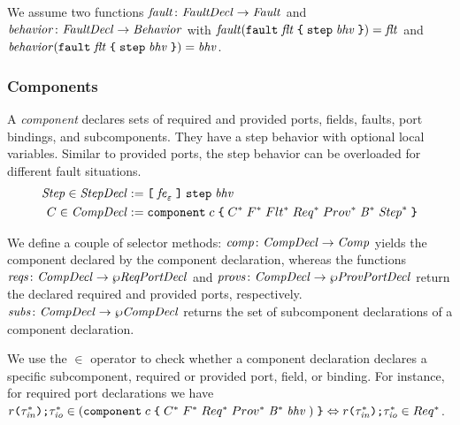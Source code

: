 \documentclass[a4paper,10pt,english]{article}
\begin{document}
We assume two functions $\mathit{fault} \colon \mathit{FaultDecl} \rightarrow \mathit{Fault}$ and $\mathit{behavior} \colon \mathit{FaultDecl} \rightarrow \mathit{Behavior}$
with $\mathit{fault}(\texttt{fault} \; \mathit{flt} \; \texttt{\{} \; \texttt{step} \; \mathit{bhv} \; \texttt{\}}) = \mathit{flt}$ and $\mathit{behavior}(\texttt{fault} \; \mathit{flt} \; \texttt{\{} \; \texttt{step} \; \mathit{bhv} \; \texttt{\}}) = \mathit{bhv}$.

\subsubsection{Components}
A \textit{component} declares sets of required and provided ports, fields, faults, port bindings, and subcomponents. They have a
step behavior with optional local variables. Similar to provided ports, the step behavior can be overloaded for different fault
situations.
\begin{align*}
	\mathit{Step} \in \mathit{StepDecl} &:= \texttt{[} \; \mathit{fe}_\varepsilon \; \texttt{]} \; \texttt{step} \; \mathit{bhv}
	\\
	C \in \mathit{CompDecl} &:=  
		\texttt{component} \; c \; \texttt{\{} \; C^* \; F^* \; Flt^* \; Req^* \; Prov^* \; \mathit{B}^* \; \mathit{Step}^* \; \texttt{\}}
\end{align*}

We define a couple of selector methods: $\mathit{comp} \colon \mathit{CompDecl} \rightarrow \mathit{Comp}$ yields the component declared by the
component declaration, whereas the functions $\mathit{reqs} \colon \mathit{CompDecl} \rightarrow \wp \mathit{ReqPortDecl}$ and $\mathit{provs} \colon
\mathit{CompDecl} \rightarrow \wp \mathit{ProvPortDecl}$ return the declared required and provided ports, respectively. $\mathit{subs} \colon \mathit{CompDecl} \rightarrow
\wp \mathit{CompDecl}$ returns the set of subcomponent declarations of a component declaration.


We use the $\in$ operator to check whether a component declaration declares a specific subcomponent, required or provided port,
field, or binding.
For instance, for required port declarations we have
$r \texttt{(} \tau_\mathit{in}^*\texttt{)} \texttt{;}{\tau_\mathit{io}^*} \in
(\texttt{component} \; c \; \texttt{\{} \; C^* \; F^* \; Req^* \; Prov^* \; \mathit{B}^* \; \mathit{bhv} \; ) \; \texttt{\}}
\Leftrightarrow r \texttt{(} \tau_\mathit{in}^*\texttt{)} \texttt{;}{\tau_\mathit{io}^*} \in Req^*$.
\end{document}
